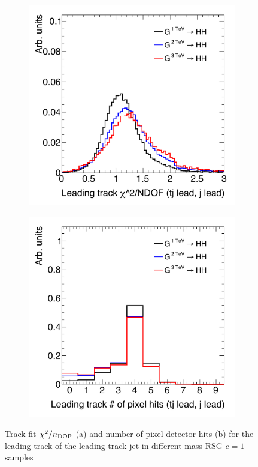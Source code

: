 \begin{figure}[h!]
  \centering
  \captionsetup{justification=centering}

   \begin{subfigure}[t]{0.5\textwidth}
        \centering
        \includegraphics[width=\textwidth]{figures/LeadTrack_Chi2NDF}
        \caption{}
    \end{subfigure}%
    \begin{subfigure}[t]{0.5\textwidth}
        \centering
        \includegraphics[width=\textwidth]{figures/LeadTrack_NPixhits}
        \caption{}
    \end{subfigure}

   \caption{Track fit $\chi^2/n_{\rm DOF}$ (a) and number of pixel detector hits (b) for the leading track of the leading track jet in different mass RSG $c=1$ samples}
  \label{fig:LeadTrack}
\end{figure}
